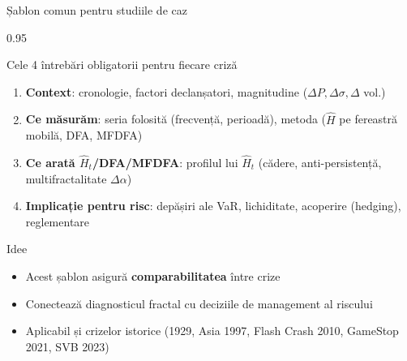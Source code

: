 \documentclass[9pt, aspectratio=169, t]{beamer}
\begin{document}
\begin{frame}[shrink=15]{Șablon comun pentru studiile de caz}
\begin{cminipage}{0.95\textwidth}
\begin{block}{Cele 4 întrebări obligatorii pentru fiecare criză}
\begin{enumerate}\setlength{\itemsep}{3pt}
    \item \textbf{Context}: cronologie, factori declanșatori, magnitudine ($\Delta P,\Delta\sigma,\Delta$ vol.)
    \item \textbf{Ce măsurăm}: seria folosită (frecvență, perioadă), metoda ($\hat H$ pe fereastră mobilă, DFA, MFDFA)
    \item \textbf{Ce arată $\hat H_t$/DFA/MFDFA}: profilul lui $\hat H_t$ (cădere, anti-persistență, multifractalitate $\Delta\alpha$)
    \item \textbf{Implicație pentru risc}: depășiri ale VaR, lichiditate, acoperire (hedging), reglementare
\end{enumerate}
\end{block}
\begin{exampleblock}{Idee}
\begin{itemize}\setlength{\itemsep}{0pt}
    \item Acest șablon asigură \textbf{comparabilitatea} între crize
    \item Conectează diagnosticul fractal cu deciziile de management al riscului
    \item Aplicabil și crizelor istorice (1929, Asia 1997, Flash Crash 2010, GameStop 2021, SVB 2023)
\end{itemize}
\end{exampleblock}
\end{cminipage}
\end{frame}
\end{document}

